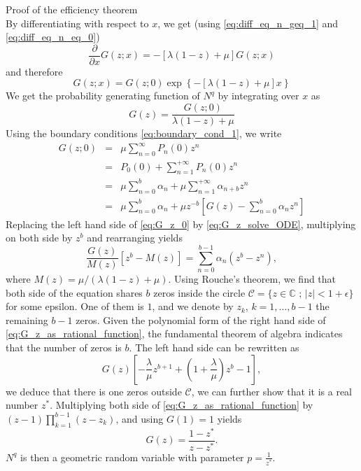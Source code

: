 \documentclass{beamer}
\begin{document}
\begin{frame}[allowframebreaks]{Proof of the efficiency theorem}
$$$$
By differentiating with respect to $x$, we get (using \eqref{eq:diff_eq_n_geq_1} and \eqref{eq:diff_eq_n_eq_0})
$$
\frac{\partial}{\partial x}G(z;x) = -\left[\lambda(1-z)+\mu\right]G(z;x)
$$
and therefore
$$
G(z;x) = G(z;0)\exp\left\{-\left[\lambda(1-z)+\mu\right]x\right\}
$$
We get the probability generating function of $N^q$ by integrating over $x$ as 
\begin{equation}\label{eq:G_z_solve_ODE}
G(z) = \frac{G(z;0)}{\lambda(1-z)+\mu}
\end{equation}
Using the boundary conditions \eqref{eq:boundary_cond_1}, we write 
\begin{eqnarray}
G(z;0) &= &\mu \sum_{n = 0}^\infty P_{n}(0)z^n \nonumber\\
&= &P_{0}(0)+\sum_{n=1}^{+\infty}P_{n}(0)z^n\nonumber\\
&=& \mu\sum_{n = 0}^{b}\alpha_n  + \mu\sum_{n=1}^{+\infty}\alpha_{n+b} z^n\nonumber\\
&=& \mu\sum_{n = 0}^{b}\alpha_n + \mu z^{-b}\left[G(z)-\sum_{n = 0}^{b}\alpha_n z^n\right]\label{eq:G_z_0}
\end{eqnarray}
Replacing the left hand side of \eqref{eq:G_z_0} by \eqref{eq:G_z_solve_ODE}, multiplying on both side by $z^b$ and rearranging yields 
\begin{equation}\label{eq:G_z_as_rational_function}
\frac{G(z)}{M(z)}[z^b - M(z)] =\sum_{n=0}^{b-1}\alpha_n(z^b - z^n), 
\end{equation}
where $M(z) = \mu/(\lambda(1-z)+\mu)$. Using Rouche's theorem, we find that both side of the equation shares $b$ zeros inside the circle $\mathcal{C} = \{z\in\mathbb{C}\text{ ; }|z| <1+\epsilon\}$ for some epsilon. One of them is $1$, and we denote by $z_k$, $k = 1,\ldots, b-1$ the remaining $b-1$ zeros. Given the polynomial form of the right hand side of \eqref{eq:G_z_as_rational_function}, the fundamental theorem of algebra indicates that the number of zeros is $b$. The left hand side can be rewritten as
$$
G(z)\left[-\frac{\lambda}{\mu}z^{b+1} + \left(1 + \frac{\lambda}{\mu}\right)z^b -1\right],
$$
we deduce that there is one zeros outside $\mathcal{C}$, we can further show that it is a real number $z^\ast$. Multiplying both side of \eqref{eq:G_z_as_rational_function} by $(z-1)\prod_{k =1}^{b-1}(z-z_k)$, and using $G(1)=1$ yields
$$
G(z) = \frac{1-z^\ast}{z-z^{\ast}}.
$$
$N^q$ is then a geometric random variable with parameter $p = \frac{1}{z^\ast}.$
\end{frame}
\end{document}
